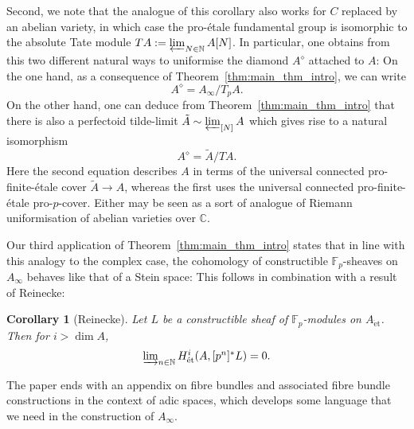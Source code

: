 \documentclass[10pt,oneside]{amsart}
\newtheorem{corollary}[theorem]{Corollary}
\theoremstyle{definition}
\newtheorem{question}[theorem]{Question}
\newtheorem{example}[theorem]{Example}
\newcommand{\et}{\operatorname{\acute{e}t}}
\newcommand{\N}{\mathbb{N}}
\newcommand{\C}{\mathbb{C}}
\newcommand{\F}{\mathbb{F}}
\begin{document}
Second, we note that the analogue of this corollary also works for $C$ replaced by an abelian variety, in which case the pro-\'etale fundamental group is isomorphic to the absolute Tate module $TA:=\varprojlim_{N\in \N}A[N]$. In particular, one obtains from this two different natural ways to uniformise the diamond $A^{\diamond}$ attached to $A$: On the one hand, as a consequence of Theorem~\ref{thm:main_thm_intro}, we can write
\[ A^{\diamond}=A_\infty/T_pA.\]
On the other hand, one can deduce from Theorem~\ref{thm:main_thm_intro} that there is also a perfectoid tilde-limit $\tilde{A}\sim \varprojlim_{[N]} A$ which gives rise to a natural isomorphism
\[ A^{\diamond}=\tilde{A}/T A.\]
Here the second equation describes $A$ in terms of the universal connected pro-finite-\'etale cover $\tilde{A}\to A$, whereas the first uses the universal connected pro-finite-\'etale pro-$p$-cover.
Either may be seen as a sort of analogue of Riemann uniformisation of abelian varieties over $\C$. 

Our third application of Theorem~\ref{thm:main_thm_intro} states that in line with this analogy to the complex case, the cohomology of constructible $\F_p$-sheaves on $A_\infty$ behaves like that of a Stein space: This follows in combination with a result of Reinecke:
\begin{corollary}[Reinecke]
	Let $L$ be a constructible sheaf of $\mathbb F_p$-modules on $A_{\et}$. Then for $i>\dim A$,
	\[\textstyle\varinjlim_{n\in \mathbb N}H_{\et}^i(A,[p^n]^{\ast}L)=0.\]
\end{corollary}


 The paper ends with an appendix on fibre bundles and associated fibre bundle constructions in the context of adic spaces, which develops some language that we need in the construction of $A_\infty$.

 \begin{comment}
Now we end the introduction by describing the content of each section. 

	\begin{question} \label{question_intro}
	    \begin{enumerate} 
	    \item		Given a rigid group $G$, when is there an adic space $G_\infty$ such that $G_\infty \sim  \varprojlim_{[p]} G ?$
	    \item If it exists, and $K$ is perfectoid, when is $G_\infty$ perfectoid?
	    \end{enumerate}
	\end{question}
 
 
	But before we give proofs for examples of rigid groups $G$ for which a perfectoid tilde-limit exists, we first note that the second question certainly doesn't have an affirmative answer for all rigid group varieties:
	\begin{example}
		For the additive group $\mathbb G_a^{\operatorname{an}}$, we know that $[p]$ is an isomorphism and therefore $\varprojlim_{[p]} \mathbb G_a=\mathbb G_a$ exists (even as an actual limit in the category of adic spaces) but is certainly not perfectoid.
	\end{example}

\end{comment} 
 
\end{document}
